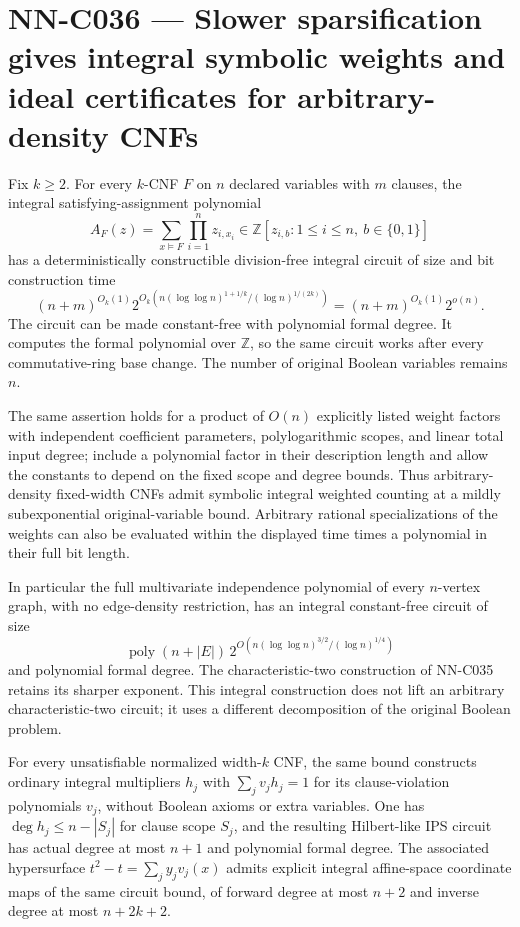 \section{NN-C036 --- Slower sparsification gives integral symbolic weights and ideal certificates for arbitrary-density CNFs}
\begin{proposition}[NN-C036]
Fix $k\ge2$. For every $k$-CNF $F$ on $n$ declared variables with $m$ clauses, the integral satisfying-assignment polynomial
\[
       A_F(z)=\sum_{x\models F}\prod_{i=1}^n z_{i,x_i}
                      \in\mathbb Z[z_{i,b}:1\le i\le n,\ b\in\{0,1\}]
\]
has a deterministically constructible division-free integral circuit of size and bit construction time
\[
 (n+m)^{O_k(1)}
  2^{O_k\!\left(n(\log\log n)^{1+1/k}/(\log n)^{1/(2k)}\right)}
                                                    = (n+m)^{O_k(1)}2^{o(n)}.
\]
The circuit can be made constant-free with polynomial formal degree. It computes the formal polynomial over $\mathbb Z$, so the same circuit works after every commutative-ring base change. The number of original Boolean variables remains $n$.

The same assertion holds for a product of $O(n)$ explicitly listed weight factors with independent coefficient parameters, polylogarithmic scopes, and linear total input degree; include a polynomial factor in their description length and allow the constants to depend on the fixed scope and degree bounds. Thus arbitrary-density fixed-width CNFs admit symbolic integral weighted counting at a mildly subexponential original-variable bound. Arbitrary rational specializations of the weights can also be evaluated within the displayed time times a polynomial in their full bit length.

In particular the full multivariate independence polynomial of every $n$-vertex graph, with no edge-density restriction, has an integral constant-free circuit of size
\[
 \operatorname{poly}(n+|E|)\,
       2^{O\!\left(n(\log\log n)^{3/2}/(\log n)^{1/4}\right)}
\]
and polynomial formal degree. The characteristic-two construction of NN-C035 retains its sharper exponent. This integral construction does not lift an arbitrary characteristic-two circuit; it uses a different decomposition of the original Boolean problem.

For every unsatisfiable normalized width-$k$ CNF, the same bound constructs ordinary integral multipliers $h_j$ with $\sum_jv_jh_j=1$ for its clause-violation polynomials $v_j$, without Boolean axioms or extra variables. One has $\deg h_j\le n-|S_j|$ for clause scope $S_j$, and the resulting Hilbert-like IPS circuit has actual degree at most $n+1$ and polynomial formal degree. The associated hypersurface $t^2-t=\sum_jy_jv_j(x)$ admits explicit integral affine-space coordinate maps of the same circuit bound, of forward degree at most $n+2$ and inverse degree at most $n+2k+2$.
\end{proposition}
